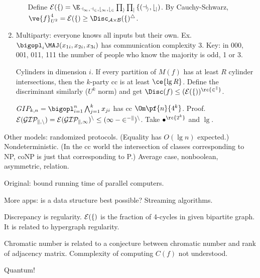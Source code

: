\begin{enumerate}
\begin{enumerate}
Define $\cal E(f)=\E_{a_1,a_2,b_1,b_2}\prod_i\prod_jf(a_i,b_j)$.  By Cauchy-Schwarz, $\ve{f}_{U^2}^4=\cal E(f)\ge \Disc_{A\times B}(f)^4$.
\end{enumerate}
\item Multiparty: everyone knows all inputs but their own.
Ex. $\bigopl_i \MAJ(x_{1i},x_{2i},x_{3i})$ has communication complexity 3. Key: in 000, 001, 011, 111 the number of people who know the majority is odd, 1 or 3.

Cylinders in dimension $i$. If every partition of $M(f)$ has at least $R$ cylinder intersections, then the $k$-party cc is at least $\ce{\lg R}$. Define the discriminant similarly ($U^k$ norm) and get $\Disc(f)\le (\cal E(f))^{\rc{2^k}}$. 

$GIP_{k,n}=\bigopl_{i=1}^n\bigwedge_{j=1}^k x_{ji}$ has cc $\Om\pf{n}{4^k}$. Proof. $\cal E(GIP_{k,n})=\cal E(GIP_{k,1})^n\le (1-2^{-k})^n$. Take $\bullet^{\rc{2^k}}$ and $\lg$.

\end{enumerate}
Other models: randomized protocols. (Equality has $O(\lg n)$ expected.) Nondeterministic. (In the cc world the intersection of classes corresponding to NP, coNP is just that corresponding to P.) Average case, nonboolean, asymmetric, relation.

Original: bound running time of parallel computers. 

More apps: is a data structure best possible? Streaming algorithms.

Discrepancy is regularity. $\cal E(f)$ is the fraction of 4-cycles in given bipartite graph. It is related to hypergraph regularity.

Chromatic number is related to a conjecture between chromatic number and rank of adjacency matrix. Commplexity of computing $C(f)$ not understood.

Quantum!

